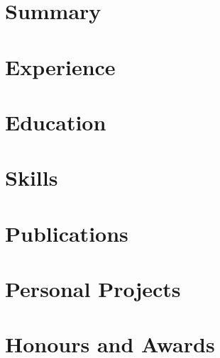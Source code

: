 \documentclass[english,a4paper,10pt]{extarticle}
\begin{document}
\pagestyle{normal_page}
\thispagestyle{first_page}

\section{Summary}


\section{Experience}


\section{Education}


\section{Skills}


\section{Publications}


\section{Personal Projects}


\section{Honours and Awards}


\thispagestyle{last_page}

\end{document}
